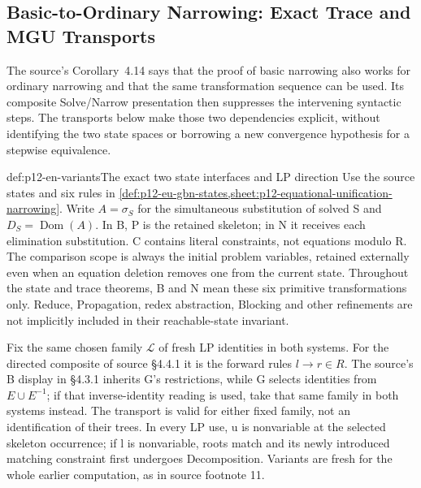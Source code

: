\subsection{Basic-to-Ordinary Narrowing: Exact Trace and MGU Transports}
\label{sec:p12-equational-narrowing-transport}

The source's Corollary~4.14 says that the proof of basic narrowing also
works for ordinary narrowing and that the same transformation sequence
can be used. Its composite Solve/Narrow presentation then suppresses
the intervening syntactic steps. The transports below make those two
dependencies explicit, without identifying the two state spaces or
borrowing a new convergence hypothesis for a stepwise equivalence.
\cite[\S\S4.3.1--4.4.1, pp.~496--499]{BaaderSnyder2001}

\begin{hbdefinition}{def:p12-en-variants}{The exact two state interfaces and LP direction}
Use the source states and six rules in
\cref{def:p12-eu-gbn-states,sheet:p12-equational-unification-narrowing}.
Write \(A=\sigma_S\) for the simultaneous substitution of solved S
and \(D_S=\operatorname{Dom}(A)\). In B, P is the retained skeleton;
in N it receives each elimination substitution. C contains literal
constraints, not equations modulo R. The comparison scope is always
the initial problem variables, retained externally even when an
equation deletion removes one from the current state.
Throughout the state and trace theorems, B and N mean these six
primitive transformations only. Reduce, Propagation, redex abstraction,
Blocking and other refinements are not implicitly included in their
reachable-state invariant.

Fix the same chosen family \(\mathcal L\) of fresh LP identities
in both systems. For the directed composite of source \S4.4.1 it is
the forward rules \(l\to r\in R\). The source's B display in
\S4.3.1 inherits G's restrictions, while G selects identities from
\(E\cup E^{-1}\); if that inverse-identity reading is used,
take that same family in both systems instead. The transport is
valid for either fixed family, not an identification of their trees.
In every LP use, u is nonvariable at the selected skeleton occurrence;
if l is nonvariable, roots match and its newly introduced matching
constraint first undergoes Decomposition. Variants are fresh for the
whole earlier computation, as in source footnote 11.
\cite[\S4.1.1, pp.~488--489; \S4.3.1, p.~496]{BaaderSnyder2001}
\end{hbdefinition}

